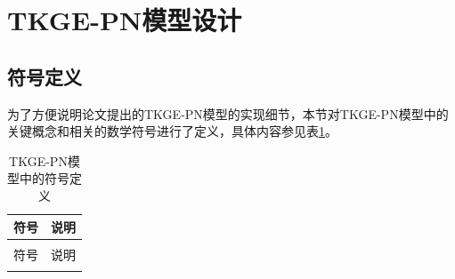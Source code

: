 \section{TKGE-PN模型设计}

\subsection{符号定义}
为了方便说明论文提出的TKGE-PN模型的实现细节，本节对TKGE-PN模型中的关键概念和相关的数学符号进行了定义，具体内容参见表\ref{definition_TKGE-PN}。

\setlength{\tabcolsep}{20pt}

\renewcommand\arraystretch{1.2}
\begin{longtable}[htbp]{cc}
  \caption{TKGE-PN模型中的符号定义}
  \label{definition_TKGE-PN}\\
  \toprule
  符号  & 说明\\
  \midrule
  \endfirsthead
  \caption{TKGE-PN模型中的符号定义}\\
  \toprule
  符号  & 说明 \\
  \midrule
  \endhead
  \hline
  \endfoot
  \bottomrule
  \endlastfoot
  

\end{longtable}
